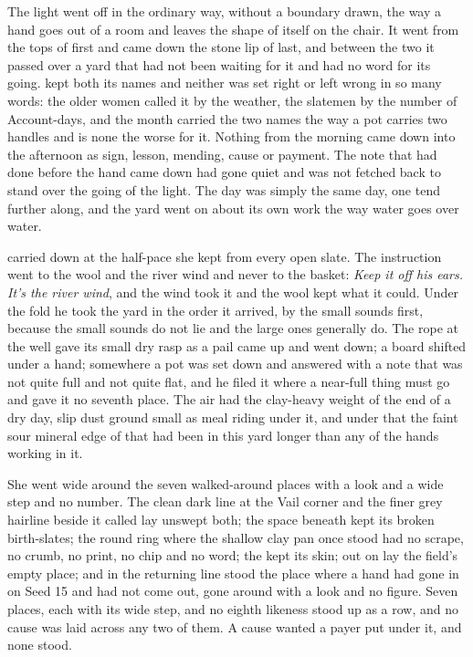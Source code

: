 The light went off  in the ordinary way, without a boundary drawn, the way a hand goes out of a room and leaves the shape of itself on the chair. It went from the tops of  first and came down the stone lip of  last, and between the two it passed over a yard that had not been waiting for it and had no word for its going.  kept both its names and neither was set right or left wrong in so many words: the older women called it by the weather, the slatemen by the number of Account-days, and the month carried the two names the way a pot carries two handles and is none the worse for it. Nothing from the morning came down into the afternoon as sign, lesson, mending, cause or payment. The note that had done before the hand came down had gone quiet and was not fetched back to stand over the going of the light. The day was simply the same day, one tend further along, and the yard went on about its own work the way water goes over water.

 carried  down at the half-pace she kept from every open slate. The instruction went to the wool and the river wind and never to the basket: \emph{Keep it off his ears. It's the river wind}, and the wind took it and the wool kept what it could. Under the fold he took the yard in the order it arrived, by the small sounds first, because the small sounds do not lie and the large ones generally do. The rope at the well gave its small dry rasp as a pail came up and went down; a board shifted under a hand; somewhere a pot was set down and answered with a note that was not quite full and not quite flat, and he filed it where a near-full thing must go and gave it no seventh place. The air had the clay-heavy weight of the end of a dry day, slip dust ground small as meal riding under it, and under that the faint sour mineral edge of  that had been in this yard longer than any of the hands working in it.

She went wide around the seven walked-around places with a look and a wide step and no number. The clean dark line at the Vail corner and the finer grey hairline beside it called  lay unswept both; the space beneath  kept its broken birth-slates; the round ring where the shallow clay pan once stood had no scrape, no crumb, no print, no chip and no word; the  kept its skin; out on  lay the field's empty place; and in the returning line stood the place where a hand had gone in on Seed 15 and had not come out, gone around with a look and no figure. Seven places, each with its wide step, and no eighth likeness stood up as a row, and no cause was laid across any two of them. A cause wanted a payer put under it, and none stood.

